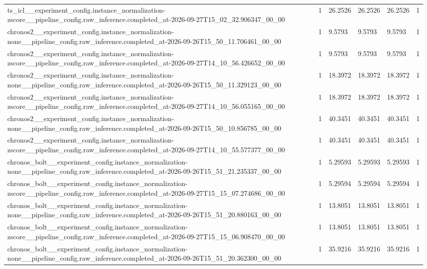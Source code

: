 \begin{tabular}{llllll}
ts\_icl\_\_experiment\_config.instance\_normalization-zscore\_\_pipeline\_config.raw\_inference.completed\_at-2026-09-27T15\_02\_32.906347\_00\_00 & 1 & 26.2526 & 26.2526 & 26.2526 & 1 \\
chronos2\_\_experiment\_config.instance\_normalization-none\_\_pipeline\_config.raw\_inference.completed\_at-2026-09-26T15\_50\_11.706461\_00\_00 & 1 & 9.5793 & 9.5793 & 9.5793 & 1 \\
chronos2\_\_experiment\_config.instance\_normalization-zscore\_\_pipeline\_config.raw\_inference.completed\_at-2026-09-27T14\_10\_56.426652\_00\_00 & 1 & 9.5793 & 9.5793 & 9.5793 & 1 \\
chronos2\_\_experiment\_config.instance\_normalization-none\_\_pipeline\_config.raw\_inference.completed\_at-2026-09-26T15\_50\_11.329123\_00\_00 & 1 & 18.3972 & 18.3972 & 18.3972 & 1 \\
chronos2\_\_experiment\_config.instance\_normalization-zscore\_\_pipeline\_config.raw\_inference.completed\_at-2026-09-27T14\_10\_56.055165\_00\_00 & 1 & 18.3972 & 18.3972 & 18.3972 & 1 \\
chronos2\_\_experiment\_config.instance\_normalization-none\_\_pipeline\_config.raw\_inference.completed\_at-2026-09-26T15\_50\_10.856785\_00\_00 & 1 & 40.3451 & 40.3451 & 40.3451 & 1 \\
chronos2\_\_experiment\_config.instance\_normalization-zscore\_\_pipeline\_config.raw\_inference.completed\_at-2026-09-27T14\_10\_55.577377\_00\_00 & 1 & 40.3451 & 40.3451 & 40.3451 & 1 \\
chronos\_bolt\_\_experiment\_config.instance\_normalization-none\_\_pipeline\_config.raw\_inference.completed\_at-2026-09-26T15\_51\_21.235337\_00\_00 & 1 & 5.29593 & 5.29593 & 5.29593 & 1 \\
chronos\_bolt\_\_experiment\_config.instance\_normalization-zscore\_\_pipeline\_config.raw\_inference.completed\_at-2026-09-27T15\_15\_07.274686\_00\_00 & 1 & 5.29594 & 5.29594 & 5.29594 & 1 \\
chronos\_bolt\_\_experiment\_config.instance\_normalization-none\_\_pipeline\_config.raw\_inference.completed\_at-2026-09-26T15\_51\_20.880163\_00\_00 & 1 & 13.8051 & 13.8051 & 13.8051 & 1 \\
chronos\_bolt\_\_experiment\_config.instance\_normalization-zscore\_\_pipeline\_config.raw\_inference.completed\_at-2026-09-27T15\_15\_06.908470\_00\_00 & 1 & 13.8051 & 13.8051 & 13.8051 & 1 \\
chronos\_bolt\_\_experiment\_config.instance\_normalization-none\_\_pipeline\_config.raw\_inference.completed\_at-2026-09-26T15\_51\_20.362300\_00\_00 & 1 & 35.9216 & 35.9216 & 35.9216 & 1 \\

\end{tabular}
